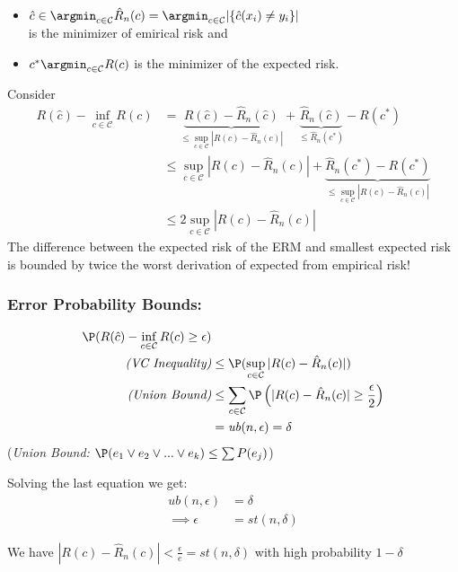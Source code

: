 \begin{itemize}
	\item $\hat c \in \argmin_{c\in\mathcal C} \hat R_n(c) = \argmin_{c\in\mathcal C} |\{\hat c(x_i)\neq y_i\}|$ \\is the minimizer of emirical risk and
	\item $c^*\argmin_{c\in\mathcal C} R(c)$ is the minimizer of the expected risk.
\end{itemize}

Consider
\begin{align*}
	R(\hat c) - \inf_{c\in\mathcal C}R(c) 	&= \underbrace{R(\hat c) - \hat R_n(\hat c)}_{\leq\sup_{c\in\mathcal C}|R(c) - \hat R_n(c)|} + \underbrace{\hat R_n(\hat c)}_{\leq \hat R_n(c^*)} - R(c^*) \\
											&\leq \sup_{c\in\mathcal C}|R(c) - \hat R_n(c)| 
												+ \underbrace{\hat R_n(c^*) - R(c^*)}_{\leq\sup_{c\in\mathcal C} |R(c) - \hat R_n(c)|}\\
											&\leq 2 \sup_{c\in\mathcal C}|R(c) - \hat R_n(c)| 
\end{align*}
The difference between the expected risk of the ERM and smallest expected risk is bounded by twice the worst derivation of expected from empirical risk!

\subsubsection{Error Probability Bounds: }
\begin{align*}
	\P(R(\hat c) - \inf_{c\in\mathcal C}R(c) \geq\epsilon) 	&\\
	\textit{(VC Inequality)}									&\leq \P(\sup_{c\in\mathcal C}|R(c) - \hat R_n(c)|) \\
	\textit{(Union Bound)}									&\leq \sum_{c\in\mathcal C}\P\left(|R(c) - \hat R_n(c)|\geq\frac{\epsilon}{2}\right) \\
															&= \mathit{ub}(n, \epsilon) = \delta
\end{align*}
(\textit{Union Bound: $\P(e_1\lor e_2 \lor ... \lor e_k)\leq \sum P(e_j)$})

Solving the last equation we get: 
\begin{align*}
	\mathit{ub}(n, \epsilon) 	&= \delta \\
		\implies	\epsilon		&= \mathit{st}(n, \delta) 
\end{align*}

We have $|R(c) - \hat R_n(c)| <\frac{\epsilon}{e} = \mathit{st}(n, \delta)$ with high probability $1-\delta$

